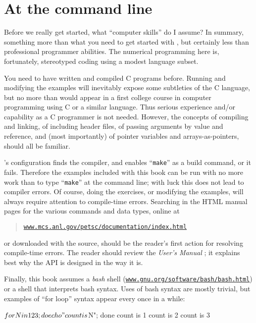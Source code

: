 \section{At the command line}

Before we really get started, what ``computer skills'' do I assume?  In summary, something more than what you need to get started with \Matlab, but certainly less than professional programmer abilities.  The numerical programming here is, fortunately, stereotyped coding using a modest language subset.

You need to have written and compiled C programs before.   Running and modifying the examples will inevitably expose some subtleties of the C language, but no more than would appear in a first college course in computer programming using C or a similar language.  Thus serious experience and/or capability as a C programmer is not needed.  However, the concepts of compiling and linking, of including header files, of passing arguments by value and reference, and (most importantly) of pointer variables and arrays-as-pointers, should all be familiar.

\PETSc's configuration finds the compiler, and enables ``\texttt{make}'' as a build command, or it fails.  Therefore the examples included with this book can be run with no more work than to type ``\texttt{make}'' at the command line; with luck this does not lead to compiler errors.  Of course, doing the exercises, or modifying the examples, will always require attention to compile-time errors.  Searching in the \PETSc HTML manual pages for the various commands and data types, online at
\begin{quote}
\href{http://www.mcs.anl.gov/petsc/documentation/index.html}{\texttt{www.mcs.anl.gov/petsc/documentation/index.html}}
\end{quote}
or downloaded with the \PETSc source, should be the reader's first action for resolving compile-time errors.  The reader should review the \emph{\PETSc User's Manual} \citep{petsc-user-ref}; it explains best why the API is designed in the way it is.

Finally, this book assumes a \emph{bash} shell (\href{https://www.gnu.org/software/bash/bash.html}{\texttt{www.gnu.org/software/bash/bash.html}}) or a shell that interprets bash syntax.  Uses of bash syntax are mostly trivial, but examples of ``for loop'' syntax appear every once in a while:
\begin{cline}
$ for N in 1 2 3; do echo "count is $N"; done
count is 1
count is 2
count is 3
\end{cline}
